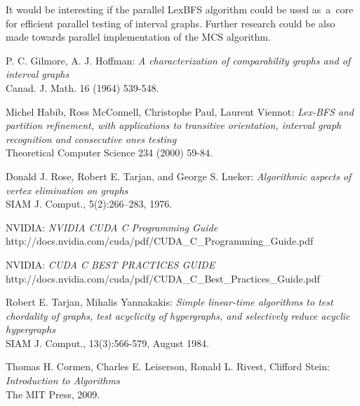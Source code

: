 \documentclass[a4paper, 11pt]{article}
\begin{document}
It would be interesting if the parallel LexBFS algorithm could be used as~a~core for 
efficient parallel testing of interval graphs. Further research could be also made 
towards parallel implementation of the MCS algorithm. 




\newpage

\begin{thebibliography}{}
     P. C. Gilmore, A. J. Hoffman: \textit{A characterization of comparability 
        graphs and of interval graphs}\\
        Canad. J. Math. 16 (1964) 539-548.
        
     Michel Habib, Ross McConnell, Christophe Paul, Laurent Viennot:
        \textit{Lex-BFS and partition refinement, with applications to transitive orientation,
        interval graph recognition and consecutive ones testing}\\
        Theoretical Computer Science 234 (2000) 59-84.

     Donald J. Rose, Robert E. Tarjan, and George S. Lueker:
        \textit{Algorithmic aspects of vertex elimination on graphs}\\
        SIAM J. Comput., 5(2):266–283, 1976.
    
     NVIDIA: 
        \textit{NVIDIA CUDA C Programming Guide}\\
        http://docs.nvidia.com/cuda/pdf/CUDA\_C\_Programming\_Guide.pdf

     NVIDIA: 
        \textit{CUDA C BEST PRACTICES GUIDE}\\
        http://docs.nvidia.com/cuda/pdf/CUDA\_C\_Best\_Practices\_Guide.pdf

     Robert E. Tarjan, Mihalis Yannakakis: 
        \textit{Simple linear-time algorithms to test chordality of graphs, test 
            acyclicity of hypergraphs, and selectively reduce acyclic hypergraphs}\\
            SIAM J. Comput., 13(3):566-579, August 1984.

     Thomas H. Cormen, Charles E. Leiserson, Ronald L. Rivest, Clifford Stein:
            \textit{Introduction to Algorithms}\\
            The MIT Press, 2009.

\end{thebibliography}
\end{document}
